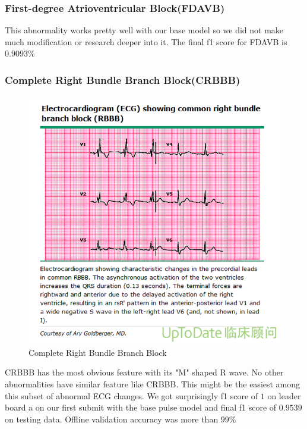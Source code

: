 \documentclass[%
 reprint,
 amsmath,amssymb,
 aps,
]{revtex4-2}
\begin{document}
\subsubsection{First-degree Atrioventricular Block(FDAVB)}
This abnormality works pretty well with our base model so we did not make much modification or research deeper into it. The final f1 score for FDAVB is $0.9093\%$

\subsubsection{Complete Right Bundle Branch Block(CRBBB)}
\begin{figure}[H]
	\includegraphics[width=\linewidth]{img/RBBB.png}
	\caption{\label{fig:RBBB} Complete Right Bundle Branch Block \cite{UptoDate}}
\end{figure}
CRBBB has the most obvious feature with its "M" shaped R wave. No other abnormalities have similar feature like CRBBB. This might be the easiest among this subset of abnormal ECG changes. We got surprisingly f1 score of $1$ on leader board a on our first submit with the base pulse model and final f1 score of $0.9539$ on testing data. Offline validation accuracy was more than $99\%$ 
\end{document}
